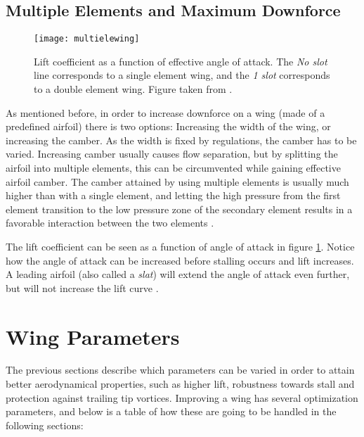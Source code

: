    \subsection{Multiple Elements and Maximum Downforce}
      \begin{figure}[ht]
        \texttt{[image: multielewing]}
        \caption{Lift coefficient as a function of effective angle of attack. The \emph{No slot} line corresponds to a single element wing, and the \emph{1 slot} corresponds to a double element wing. Figure taken from \cite{jkatz}.}
        \label{fig:multielewing}
      \end{figure}

      As mentioned before, in order to increase downforce on a wing (made of a predefined airfoil) there is two options: Increasing the width of the wing, or increasing the camber. As the width is fixed by regulations, the camber has to be varied. Increasing camber usually causes flow separation, but by splitting the airfoil into multiple elements, this can be circumvented while gaining effective airfoil camber. The camber attained by using multiple elements is usually much higher than with a single element, and letting the high pressure from the first element transition to the low pressure zone of the secondary element results in a favorable interaction between the two elements .

      The lift coefficient can be seen as a function of angle of attack in figure \ref{fig:multielewing}. Notice how the angle of attack can be increased before stalling occurs and lift increases. A leading airfoil (also called a \emph{slat}) will extend the angle of attack even further, but will not increase the lift curve \cite{jkatz}.

\section{Wing Parameters}

  The previous sections describe which parameters can be varied in order to attain better aerodynamical properties, such as higher lift, robustness towards stall and protection against trailing tip vortices. Improving a wing has several optimization parameters, and below is a table of how these are going to be handled in the following sections:

